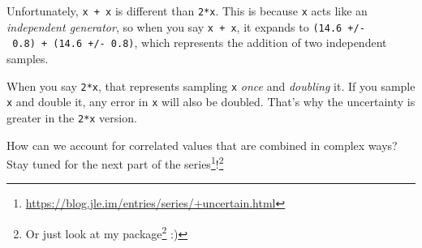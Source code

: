 \documentclass[]{article}
\renewcommand{\href}[2]{#2\footnote{\url{#1}}}
\begin{document}
Unfortunately, \texttt{x\ +\ x} is different than \texttt{2*x}. This is
because \texttt{x} acts like an \emph{independent generator}, so when
you say \texttt{x\ +\ x}, it expands to
\texttt{(14.6\ +/-\ 0.8)\ +\ (14.6\ +/-\ 0.8)}, which represents the
addition of two independent samples.

When you say \texttt{2*x}, that represents sampling \texttt{x}
\emph{once} and \emph{doubling} it. If you sample \texttt{x} and double
it, any error in \texttt{x} will also be doubled. That's why the
uncertainty is greater in the \texttt{2*x} version.

How can we account for correlated values that are combined in complex
ways? Stay tuned for the next part of the
\href{https://blog.jle.im/entries/series/+uncertain.html}{series}!\footnote{Or
  just look at my
  \href{https://hackage.haskell.org/package/uncertain}{package} :)}
\end{document}

